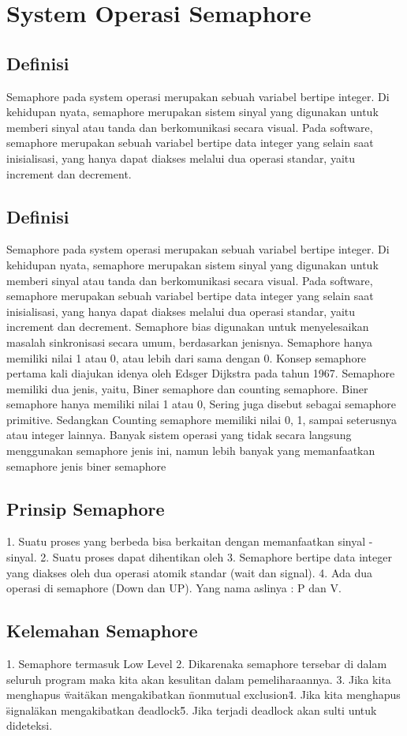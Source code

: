 \section{System Operasi Semaphore}
	\subsection{Definisi}
	Semaphore pada system operasi merupakan sebuah variabel bertipe integer. Di kehidupan nyata, semaphore merupakan sistem sinyal yang digunakan untuk memberi 
	sinyal atau tanda dan berkomunikasi secara visual. Pada software, semaphore merupakan sebuah variabel bertipe data integer yang selain saat inisialisasi, yang hanya dapat diakses melalui dua operasi standar, yaitu increment dan decrement.
\subsection{Definisi}
Semaphore pada system operasi merupakan sebuah variabel bertipe integer. Di kehidupan nyata, semaphore merupakan sistem sinyal yang
digunakan untuk memberi sinyal atau tanda dan berkomunikasi secara visual. Pada software, semaphore merupakan sebuah variabel bertipe data
integer yang selain saat inisialisasi, yang hanya dapat diakses melalui dua operasi standar, yaitu increment dan decrement. Semaphore bias
digunakan untuk menyelesaikan masalah sinkronisasi secara umum, berdasarkan jenisnya. Semaphore hanya memiliki nilai 1 atau 0, atau lebih
dari sama dengan 0. Konsep semaphore pertama kali diajukan idenya oleh Edsger Dijkstra pada tahun 1967. Semaphore memiliki dua jenis,
yaitu, Biner semaphore dan counting semaphore. Biner semaphore hanya memiliki nilai 1 atau 0, Sering juga disebut sebagai semaphore
primitive. Sedangkan Counting semaphore memiliki nilai 0, 1, sampai seterusnya atau integer lainnya. Banyak sistem operasi yang tidak
secara langsung menggunakan semaphore jenis ini, namun lebih banyak yang memanfaatkan semaphore jenis biner semaphore

\subsection{Prinsip Semaphore}
1. Suatu proses yang berbeda bisa berkaitan dengan memanfaatkan sinyal - sinyal.
2. Suatu proses dapat dihentikan oleh 
3. Semaphore bertipe data integer yang diakses oleh dua operasi atomik standar (wait dan signal).
4. Ada dua operasi di semaphore (Down dan UP). Yang nama aslinya : P dan V.

\subsection{Kelemahan Semaphore}
1. Semaphore termasuk Low Level
2. Dikarenaka semaphore tersebar di dalam seluruh program maka kita akan kesulitan dalam pemeliharaannya.
3. Jika kita menghapus \"wait\" akan mengakibatkan \"nonmutual exclusion\"
4. Jika kita menghapus \"signal\" akan mengakibatkan \"deadlock\"
5. Jika terjadi deadlock akan sulti untuk dideteksi.

